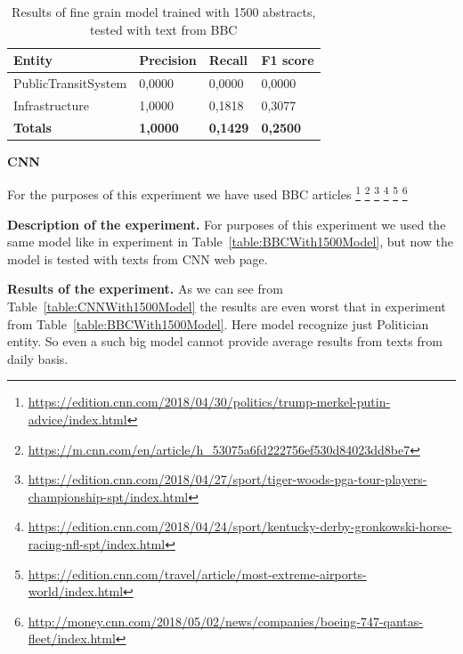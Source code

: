 \documentclass[thesis=M,english]{FITthesis}[2018/05/30]
\begin{document}
	\begin{table}[H]\centering
	\begin{tabular}{|l|l|l|l|}
		\hline {\textbf{Entity}} & {\textbf{Precision}} & {\textbf{Recall}} & {\textbf{F1 score}}\\\hline
   		PublicTransitSystem & 0,0000 & 0,0000 & 0,0000\\
   		Infrastructure &  1,0000 & 0,1818 & 0,3077	\\\hline  
		\textbf{Totals} & \textbf{1,0000} & \textbf{0,1429} & \textbf{0,2500}\\\hline
	\end{tabular}			
		\caption{Results of fine grain model trained with 1500 abstracts, tested with text from BBC\label{table:BBCTransportationWith500TransportationModel}}
	\end{table}
	
	
	
	
	\textbf{CNN} 
	
	For the purposes of this experiment we have used BBC articles \footnote{\url{https://edition.cnn.com/2018/04/30/politics/trump-merkel-putin-advice/index.html}} \footnote{\url{https://m.cnn.com/en/article/h_53075a6fd222756ef530d84023dd8be7}} \footnote{\url{https://edition.cnn.com/2018/04/27/sport/tiger-woods-pga-tour-players-championship-spt/index.html}} \footnote{\url{https://edition.cnn.com/2018/04/24/sport/kentucky-derby-gronkowski-horse-racing-nfl-spt/index.html}} \footnote{\url{https://edition.cnn.com/travel/article/most-extreme-airports-world/index.html}} \footnote{\url{http://money.cnn.com/2018/05/02/news/companies/boeing-747-qantas-fleet/index.html}}

\textbf{Description of the experiment.} For purposes of this experiment we used the same model like in experiment in Table~\ref{table:BBCWith1500Model}, but now the model is tested with texts from CNN web page.

\textbf{Results of the experiment.} As we can see from Table~\ref{table:CNNWith1500Model} the results are even worst that in experiment from Table~\ref{table:BBCWith1500Model}. Here model recognize just Politician entity. So even a such big model cannot provide average results from texts from daily basis.
\end{document}
